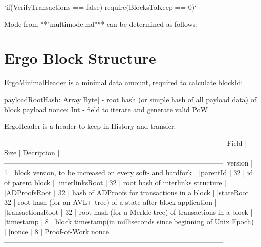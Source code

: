 \documentclass[]{report}   %
\begin{document}
`if(VerifyTransactions == false) require(BlocksToKeep == 0)`

Mode from **"multimode.md"** can be determined as follows:



\section{Ergo Block Structure}

ErgoMinimalHeader is a minimal data amount, required to calculate blockId:


payloadRootHash: Array[Byte] - root hash (or simple hash of all payload data) of block payload
nonce: Int - field to iterate and generate valid PoW


ErgoHeader is a header to keep in History and transfer: 


---------------------------------------------------------------------------------------------
|Field            |  Size | Decription                                                      |
---------------------------------------------------------------------------------------------
|version          |  1    | block version, to be increased on every soft- and hardfork      |
|parentId         |  32   | id of parent block                                              |
|interlinksRoot   |  32   | root hash of interlinks structure                               |
|ADProofsRoot     |  32   | hash of ADProofs for transactions in a block                    |
|stateRoot        |  32   | root hash (for an AVL+ tree) of a state after block application |
|transactionsRoot |  32   | root hash (for a Merkle tree) of transactions in a block        |
|timestamp        |  8    | block timestamp(in milliseconds since beginning of Unix Epoch)  |
|nonce            |  8    | Proof-of-Work nonce                                             |
---------------------------------------------------------------------------------------------
\end{document}
